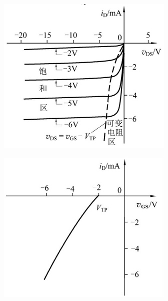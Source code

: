 \begin{figure}[H]
  \centering
  \begin{subfigure}{.45\textwidth}
    \centering
    \includegraphics[width=\linewidth]{figures/PMOSIV1}
  \end{subfigure}
  \begin{subfigure}{.45\textwidth}
    \centering
    \includegraphics[width=\linewidth]{figures/PMOSIV2}
  \end{subfigure}
\end{figure}

